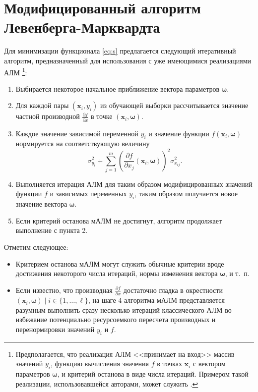 \documentclass[11pt,a4paper]{article}
\newcommand{\bomega}{\boldsymbol{\omega}}
\begin{document}
\section{Модифицированный алгоритм Левенберга-Марквардта}

Для минимизации функционала \eqref{eq:s} предлагается следующий итеративный алгоритм,
предназначенный для использования с уже имеющимися реализациями АЛМ
\footnote{Предполагается, что реализация АЛМ <<принимает на вход>> массив значений $y_i$,
функцию вычисления значения $f$ в точках $\mathbf{x}_i$ с вектором параметров $\bomega$,
и критерий останова в виде числа итераций. Примером такой реализации, использовавшейся
авторами, может служить \cite{dlib09}.}:
\begin{enumerate}
  \item Выбирается некоторое начальное приближение вектора параметров $\bomega$.
  \item Для каждой пары $(\mathbf{x}_i, y_i)$ из обучающей выборки рассчитывается значение
	частной производной $\frac{\partial f}{\partial x}$ в точке $(\mathbf{x}_i, \bomega)$.
  \item Каждое значение зависимой переменной $y_i$ и значение функции $f(\mathbf{x}_i, \bomega)$
	нормируется на соответствующую величину
	\[
	  \sigma_{y_i}^2 + \sum_{j = 1}^m (\frac{\partial f}{\partial x_j}(\mathbf{x}_i, \bomega))^2 \sigma^2_{x_{ij}}.
	\]
  \item Выполняется итерация АЛМ для таким образом модифицированных значений функции $f$
    и зависимых переменных $y_i$, таким образом получается новое значение вектора $\bomega$.
  \item Если критерий останова мАЛМ не достигнут, алгоритм продолжает выполнение с пункта 2.
\end{enumerate}

Отметим следующее:
\begin{itemize}
  \item Критерием останова мАЛМ могут служить обычные критерии вроде достижения некоторого
    числа итераций, нормы изменения вектора $\bomega$, и т.~п.
  \item Если известно, что производная $\frac{\partial f}{\partial x}$ достаточно гладка
	в окрестности $(\mathbf{x}_i, \bomega) \mid i \in \{ 1, \dots, \ell \}$, на шаге
	4 алгоритма мАЛМ представляется разумным выполнить сразу несколько итераций
	классического АЛМ во избежание потенциально ресурсоемкого пересчета производных и
	перенормировки значений $y_i$ и $f$.
\end{itemize}
\end{document}
